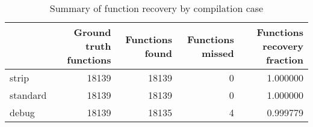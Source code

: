 \begin{table}
\centering
\caption{Summary of function recovery by compilation case}
\label{table:opts-functions-summary}
\begin{tabular}{lrrrr}
\toprule
{} &  Ground truth functions &  Functions found &  Functions missed &  Functions recovery fraction \\
\midrule
strip    &                   18139 &            18139 &                 0 &                     1.000000 \\
standard &                   18139 &            18139 &                 0 &                     1.000000 \\
debug    &                   18139 &            18135 &                 4 &                     0.999779 \\
\bottomrule
\end{tabular}
\end{table}

